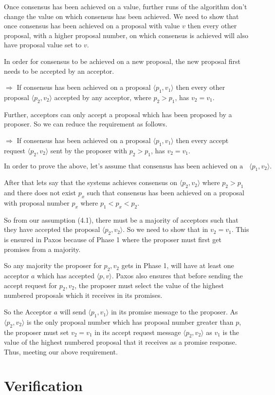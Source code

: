 Once consensus has been achieved on a value, further runs of the algorithm don't
change the value on which consensus has been achieved.
We need to show that once consensus has been achieved
on a proposal with value $v$ then every other proposal, with a higher
proposal number, on which consensus is achieved will also have
proposal value set to $v$.

In order for consensus to be achieved on a new proposal, the new
proposal first needs to be accepted by an acceptor.

$\Rightarrow$ If consensus has been achieved on a proposal
$\langle p_1, v_1 \rangle$ then every other proposal $\langle p_2, v_2 \rangle$
accepted by any acceptor, where $p_2 > p_1$, has $v_2 = v_1$.

Further, acceptors can only accept a proposal which has been proposed
by a proposer. So we can reduce the requirement as follows.

$\Rightarrow$ If consensus has been achieved on a proposal $\langle p_1, v_1 \rangle$
then every accept request $\langle p_2, v_2 \rangle$ sent by the proposer with
$p_2 > p_1$, has $v_2 = v_1$.

\begin{equation}
\textrm{In order to prove the above, let's assume that consensus has been
achieved on a proposal} \langle p_1, v_2 \rangle.
\end{equation}

After that lets say that the systems achieves consensus on
$\langle p_2, v_2 \rangle$ where $p_2 > p_1$ and there does not exist $p_x$ such
that consensus has been achieved on a proposal with proposal
number $p_x$ where $p_1 < p_x < p_2$.

So from our assumption (4.1), there must be a majority of acceptors
such that they have accepted the proposal $\langle p_2, v_2 \rangle$.
So we need to show that in $v_2 = v_1$.
This is ensured in Paxos because of Phase 1 where the proposer must first
get promises from a majority.

So any majority the proposer for $p_2, v_2$ gets in Phase 1,
will have at least one acceptor $a$ which has accepted $\langle p, v \rangle$.
Paxos also ensures that before sending the accept request for
$p_2, v_2$, the proposer must select the value of the highest numbered
proposals which it receives in its promises.

So the Acceptor $a$ will send $\langle p_1, v_1 \rangle$ in its promise message to
the proposer. As $\langle p_2, v_2 \rangle$ is the only proposal number which has
proposal number greater than $p$, the proposer must set $v_2 = v_1$ in its
accept request message $\langle p_2, v_2 \rangle$ as $v_1$ is the value of the
highest numbered proposal that it receives as a promise response.
Thus, meeting our above requirement.


\section{Verification}
